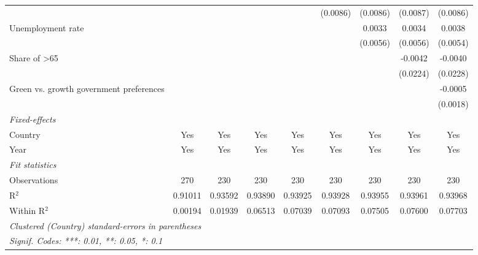 \begin{table}[htbp]
\begin{tabular}{lcccccccc}
                                                            &          &          &                &                & (0.0086)       & (0.0086)       & (0.0087)        & (0.0086)\\   
      Unemployment rate                                     &          &          &                &                &                & 0.0033         & 0.0034          & 0.0038\\   
                                                            &          &          &                &                &                & (0.0056)       & (0.0056)        & (0.0054)\\   
      Share of >65                                          &          &          &                &                &                &                & -0.0042         & -0.0040\\   
                                                            &          &          &                &                &                &                & (0.0224)        & (0.0228)\\   
      Green vs. growth government preferences               &          &          &                &                &                &                &                 & -0.0005\\   
                                                            &          &          &                &                &                &                &                 & (0.0018)\\   
      \midrule
      \emph{Fixed-effects}\\
      Country                                               & Yes      & Yes      & Yes            & Yes            & Yes            & Yes            & Yes             & Yes\\  
      Year                                                  & Yes      & Yes      & Yes            & Yes            & Yes            & Yes            & Yes             & Yes\\  
      \midrule
      \emph{Fit statistics}\\
      Observations                                          & 270      & 230      & 230            & 230            & 230            & 230            & 230             & 230\\  
      R$^2$                                                 & 0.91011  & 0.93592  & 0.93890        & 0.93925        & 0.93928        & 0.93955        & 0.93961         & 0.93968\\  
      Within R$^2$                                          & 0.00194  & 0.01939  & 0.06513        & 0.07039        & 0.07093        & 0.07505        & 0.07600         & 0.07703\\  
      \midrule \midrule
      \multicolumn{9}{l}{\emph{Clustered (Country) standard-errors in parentheses}}\\
      \multicolumn{9}{l}{\emph{Signif. Codes: ***: 0.01, **: 0.05, *: 0.1}}\\
   \end{tabular}
\end{table}


